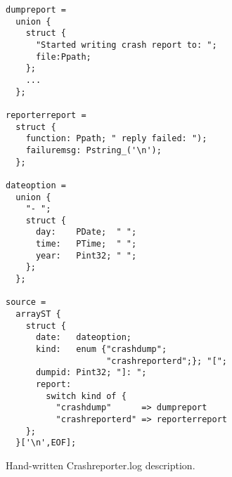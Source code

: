 \begin{figure}[t]
\begin{small}
\begin{verbatim}
dumpreport =
  union {
    struct {
      "Started writing crash report to: "; 
      file:Ppath;
    };
    ...
  };

reporterreport =
  struct {
    function: Ppath; " reply failed: ");
    failuremsg: Pstring_('\n'); 
  };

dateoption = 
  union {
    "- ";
    struct {
      day:    PDate;  " ";
      time:   PTime;  " ";
      year:   Pint32; " ";
    };
  };

source =
  arrayST {
    struct {
      date:   dateoption;
      kind:   enum {"crashdump"; 
                    "crashreporterd";}; "[";
      dumpid: Pint32; "]: ";
      report: 
        switch kind of {
          "crashdump"      => dumpreport
          "crashreporterd" => reporterreport
    };
  }['\n',EOF];
\end{verbatim}
\end{small}
\caption{Hand-written \ir{} Crashreporter.log description.} \shrink
\label{fig:crashreporter:ir}
\end{figure}


